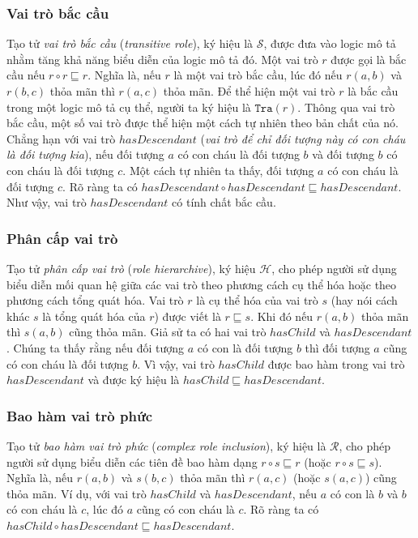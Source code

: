 \documentclass[12pt,a4paper,twoside]{report}
\newcommand{\mR}		{\mathcal{R}}
\newcommand{\mS}		{\mathcal{S}}
\newcommand{\mH}		{\mathcal{H}}
\newcommand{\Tra}			{\mathtt{Tra}}
\newcommand{\hasChild}		{hasChild}
\newcommand{\hasDescendant}	{hasDescendant}
\theoremstyle{definition}
\begin{document}
\subsubsection{Vai trò bắc cầu}
Tạo tử {\em vai trò bắc cầu} ({\em transitive role}), ký hiệu là $\mS$, được đưa vào logic mô tả nhằm tăng khả năng biểu diễn của logic mô tả đó. Một vai trò $r$ được gọi là bắc cầu nếu $r \circ r \sqsubseteq r$. Nghĩa là, nếu $r$ là một vai trò bắc cầu, lúc đó nếu $r(a,b)$ và $r(b,c)$ thỏa mãn thì $r(a,c)$ thỏa mãn. Để thể hiện một vai trò $r$ là bắc cầu trong một logic mô tả cụ thể, người ta ký hiệu là $\Tra(r)$.
%
Thông qua vai trò bắc cầu, một số vai trò được thể hiện một cách tự nhiên theo bản chất của nó. Chẳng hạn với vai trò $\hasDescendant$ ({\em vai trò để chỉ đối tượng này có con cháu là đối tượng kia}), nếu đối tượng $a$ có con cháu là đối tượng $b$ và đối tượng $b$ có con cháu là đối tượng $c$. Một cách tự nhiên ta thấy, đối tượng $a$ có con cháu là đối tượng $c$. Rõ ràng ta có $\hasDescendant \circ \hasDescendant \sqsubseteq \hasDescendant$. Như vậy, vai trò $\hasDescendant$ có tính chất bắc cầu.

\subsubsection{Phân cấp vai trò}
Tạo tử {\em phân cấp vai trò} ({\em role hierarchive}), ký hiệu $\mH$, cho phép người sử dụng biểu diễn mối quan hệ giữa các vai trò theo phương cách cụ thể hóa hoặc theo phương cách tổng quát hóa. Vai trò $r$ là cụ thể hóa của vai trò $s$ (hay nói cách khác $s$ là tổng quát hóa của $r$) được viết là $r \sqsubseteq s$. Khi đó nếu $r(a,b)$ thỏa mãn thì $s(a,b)$ cũng thỏa mãn.
Giả sử ta có hai vai trò $\hasChild$ và $\hasDescendant$. Chúng ta thấy rằng nếu đối tượng $a$ có con là đối tượng $b$ thì đối tượng $a$ cũng có con cháu là đối tượng $b$. Vì vậy, vai trò $\hasChild$ được bao hàm trong vai trò $\hasDescendant$ và được ký hiệu là $\hasChild \sqsubseteq \hasDescendant$.

\subsubsection{Bao hàm vai trò phức}
Tạo tử {\em bao hàm vai trò phức} ({\em complex role inclusion}), ký hiệu là $\mR$, cho phép người sử dụng biểu diễn các tiên đề bao hàm dạng $r \circ s \sqsubseteq r$ (hoặc $r \circ s \sqsubseteq s$). Nghĩa là, nếu $r(a,b)$ và $s(b,c)$ thỏa mãn thì $r(a,c)$ (hoặc $s(a,c)$) cũng thỏa mãn. Ví dụ, với vai trò $\hasChild$ và $\hasDescendant$, nếu $a$ có con là $b$ và $b$ có con cháu là $c$, lúc đó $a$ cũng có con cháu là $c$. Rõ ràng ta có $\hasChild \circ \hasDescendant \sqsubseteq \hasDescendant$.
\end{document}
